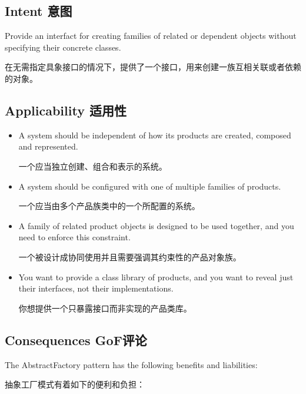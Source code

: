 \subsection{Intent 意图} 

Provide an interfact for creating families of related or dependent objects without specifying their concrete classes.

在无需指定具象接口的情况下，提供了一个接口，用来创建一族互相关联或者依赖的对象。

\subsection{Applicability 适用性}

\begin{itemize}
\item A system should be independent of how its products are created, composed and represented.

      一个应当独立创建、组合和表示的系统。

\item A system should be configured with one of multiple families of products.

      一个应当由多个产品族类中的一个所配置的系统。

\item A family of related product objects is designed to be used together, and you need to enforce this constraint.

      一个被设计成协同使用并且需要强调其约束性的产品对象族。

\item You want to provide a class library of products, and you want to reveal just their interfaces, not their implementations.

      你想提供一个只暴露接口而非实现的产品类库。
\end{itemize}

\subsection{Consequences GoF评论}

The AbstractFactory pattern has the following benefits and liabilities:

抽象工厂模式有着如下的便利和负担：

